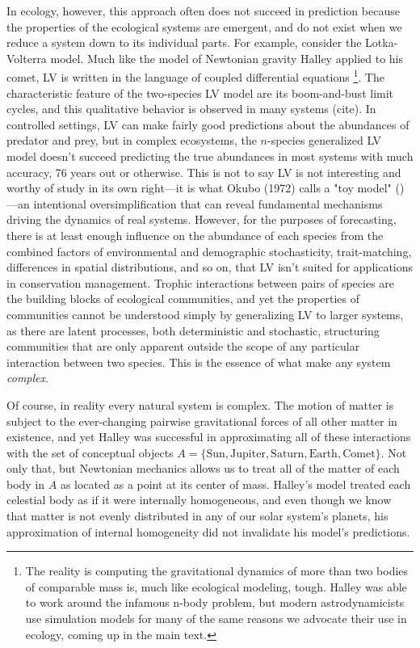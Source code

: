 \documentclass[]{article}
\begin{document}
In ecology, however, this approach often does not succeed in prediction because the properties of the ecological systems are emergent, and do
not exist when we reduce a system down to its individual parts.
For example, consider the Lotka-Volterra model.
Much like the model of Newtonian gravity Halley applied to his comet, LV is written in the
language of coupled differential equations
\footnote{The reality is computing the gravitational dynamics of more than two bodies of comparable mass is, much like ecological modeling, tough. Halley was able to work around the infamous n-body problem, but modern astrodynamicists use simulation models for many of the same reasons we advocate their use in ecology, coming up in the main text.}.
The characteristic feature of the two-species LV model are its boom-and-bust limit cycles, and this qualitative behavior is observed in many systems (cite).
In controlled settings, LV can make fairly good predictions about the abundances of predator and prey, but in complex ecosystems, the \(n\)-species generalized LV model doesn't succeed predicting the true abundances in most systems with much accuracy, 76 years out or otherwise.
This is not to say LV is not interesting and worthy of study in its own right---it is what Okubo (1972) calls a "toy model" (\cite{okubo_diffusion_2001})---an intentional oversimplification that can reveal fundamental mechanisms driving the dynamics of real systems.
However, for the purposes of forecasting, there is at least enough influence on the abundance of each species from the combined factors of environmental and demographic stochasticity, trait-matching, differences in spatial distributions, and so on, that LV isn't suited for applications in conservation management.
Trophic interactions between pairs of species are the building blocks of ecological communities, and yet the properties of communities cannot be understood simply by generalizing LV to larger systems, as there are latent processes, both deterministic and stochastic, structuring communities that are only apparent outside the scope of any particular interaction between two species. This is the essence of what make any system \emph{complex}.

Of course, in reality every natural system is complex.
The motion of matter is subject to the ever-changing pairwise gravitational forces of all other matter in existence, and yet Halley was successful in approximating all of these interactions with the set of conceptual objects \(A = \{\text{Sun}, \text{Jupiter}, \text{Saturn}, \text{Earth}, \text{Comet} \}\).
Not only that, but Newtonian mechanics allows us to treat all of the
matter of each body in \(A\) as located as a point at its center of mass.
Halley's model treated each celestial body as if it were internally homogeneous, and even though we know that matter is not evenly distributed in any of our solar system's planets, his approximation of internal homogeneity did not invalidate his model's predictions.
\end{document}
